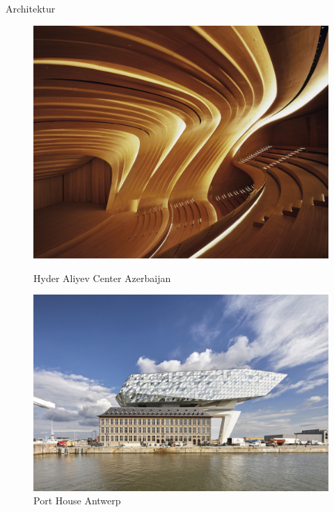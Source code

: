 \documentclass{beamer}
\begin{document}
\begin{frame}{Architektur}
    \begin{figure}[H]
        \begin{minipage}{0.4\textwidth}
           \centering
           \vfill
           \includegraphics[width=\linewidth]{figures/beispiele/architektur/hyder-aliyev-hadid.jpg}
           \caption{Hyder Aliyev Center Azerbaijan}
           \label{fig:hadid-1}
        \end{minipage}
            \hfill
        \begin{minipage}{0.4\textwidth}
           \centering
           \vfill
           \includegraphics[width=\linewidth]{figures/beispiele/architektur/antwep-port-house.jpg}
           \caption{Port House Antwerp}
           \label{fig:hadid-2}
        \end{minipage}
    \end{figure}

\end{frame}
\end{document}
